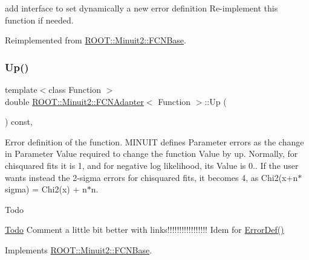 add interface to set dynamically a new error definition Re-\/implement this function if needed. 

Reimplemented from \mbox{\hyperlink{classROOT_1_1Minuit2_1_1FCNBase_a840e02c2e6ef96eec289deca096b6088}{R\+O\+O\+T\+::\+Minuit2\+::\+F\+C\+N\+Base}}.

\mbox{\label{classROOT_1_1Minuit2_1_1FCNAdapter_a3bcb29efda3b97c17bb17512c1629365}} 
\subsubsection{\texorpdfstring{Up()}{Up()}\hspace{0.1cm}{\footnotesize\ttfamily [1/3]}}
{\footnotesize\ttfamily template$<$class Function $>$ \\
double \mbox{\hyperlink{classROOT_1_1Minuit2_1_1FCNAdapter}{R\+O\+O\+T\+::\+Minuit2\+::\+F\+C\+N\+Adapter}}$<$ Function $>$\+::Up (\begin{DoxyParamCaption}{ }\end{DoxyParamCaption}) const\hspace{0.3cm}{\ttfamily [inline]}, {\ttfamily [virtual]}}

Error definition of the function. M\+I\+N\+U\+IT defines Parameter errors as the change in Parameter Value required to change the function Value by up. Normally, for chisquared fits it is 1, and for negative log likelihood, its Value is 0.. If the user wants instead the 2-\/sigma errors for chisquared fits, it becomes 4, as Chi2(x+n$\ast$sigma) = Chi2(x) + n$\ast$n.

\begin{DoxyRefDesc}{Todo}
\item[\mbox{\hyperlink{todo__todo000001}{Todo}}]Comment a little bit better with links!!!!!!!!!!!!!!!!! Idem for \mbox{\hyperlink{classROOT_1_1Minuit2_1_1FCNBase_ac4592475c58a65b037ba97ab5f3cba10}{Error\+Def()}}\end{DoxyRefDesc}


Implements \mbox{\hyperlink{classROOT_1_1Minuit2_1_1FCNBase_a04ef08ddad92ce8d89d498efbe021c39}{R\+O\+O\+T\+::\+Minuit2\+::\+F\+C\+N\+Base}}.

\mbox{\label{classROOT_1_1Minuit2_1_1FCNAdapter_a3bcb29efda3b97c17bb17512c1629365}} 
